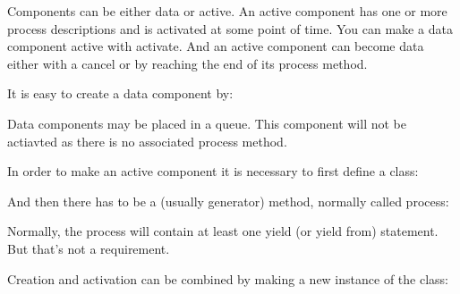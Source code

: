 \documentclass[letterpaper,10pt,english]{sphinxmanual}
\begin{document}
Components can be either data or active. An active component has one or more process descriptions and is activated
at some point of time. You can make a data component active with activate. And an active component can become
data either with a cancel or by reaching the end of its process method.

It is easy to create a data component by:

\begin{sphinxVerbatim}[commandchars=\\\{\}]
  
\end{sphinxVerbatim}

Data components may be placed in a queue. This component will not be actiavted as there is no associated process method.

In order to make an active component it is necessary to first define a class:

\begin{sphinxVerbatim}[commandchars=\\\{\}]
 
\end{sphinxVerbatim}

And then there has to be a (usually generator) method, normally called process:

\begin{sphinxVerbatim}[commandchars=\\\{\}]
 
     
         
\end{sphinxVerbatim}

Normally, the process will contain at least one yield (or yield from) statement. But that’s not a requirement.

Creation and activation can be combined by making a new instance of the class:

\begin{sphinxVerbatim}[commandchars=\\\{\}]
  
  
  
\end{sphinxVerbatim}
\end{document}
